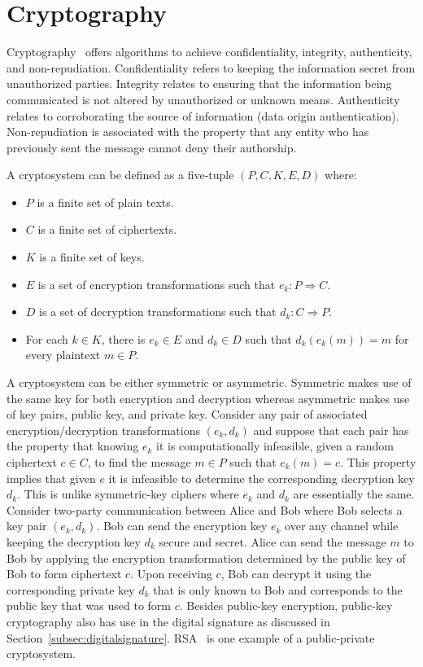 \section{Cryptography} \label{sec:cryptography}
Cryptography~\cite{katz1996handbook} offers algorithms to achieve
confidentiality, integrity, authenticity, and non-repudiation. Confidentiality
refers to keeping the information secret from unauthorized parties. Integrity
relates to ensuring that the information being communicated is not altered by
unauthorized or unknown means. Authenticity relates to corroborating the source
of information (data origin authentication). Non-repudiation is associated with
the property that any entity who has previously sent the message cannot deny
their authorship.  \par
A cryptosystem can be defined as a five-tuple $(P, C, K, E, D)$ where: 
\begin{itemize}
	\item $P$ is a finite set of plain texts.
	\item $C$ is a finite set of ciphertexts.
	\item $K$ is a finite set of keys.
	\item $E$ is a set of encryption transformations such that $e_{k}:P \Rightarrow C$.
	\item $D$ is a set of decryption transformations such that $d_{k}:C \Rightarrow P$. 
	\item For each $k \in K$, there is $e_k \in E$ and $d_k \in D$ such that
		$d_k(e_k(m)) = m$ for every plaintext $m \in P$.
\end{itemize}
A cryptosystem can be either symmetric or asymmetric. Symmetric makes use of
the same key for both encryption and decryption whereas asymmetric makes use of
key pairs, public key, and private key. Consider any pair of associated
encryption/decryption transformations $(e_{k},d_{k})$ and suppose that each
pair has the property that knowing  $e_{k}$ it is computationally infeasible,
given a random ciphertext $c \in C$, to find the message $m \in P$ such that
$e_{k}(m) = c$. This property implies that given $e$ it is infeasible to
determine the corresponding decryption key $d_{k}$. This is unlike
symmetric-key ciphers where $e_{k}$ and $d_{k}$ are essentially the same.
Consider two-party communication between Alice and Bob where Bob selects a key
pair $(e_{k}, d_{k})$. Bob can send the encryption key $e_{k}$ over any channel
while keeping the decryption key $d_{k}$ secure and secret. Alice can send the
message $m$ to Bob by applying the encryption transformation determined by the
public key of Bob to form ciphertext $c$. Upon receiving $c$, Bob can decrypt
it using the corresponding private key $d_{k}$ that is only known to Bob and
corresponds to the public key that was used to form $c$. Besides public-key
encryption, public-key cryptography also has use in the digital signature as
discussed in Section~\ref{subsec:digitalsignature}. RSA~\cite{rivest1978method}
is one example of a public-private cryptosystem. 
